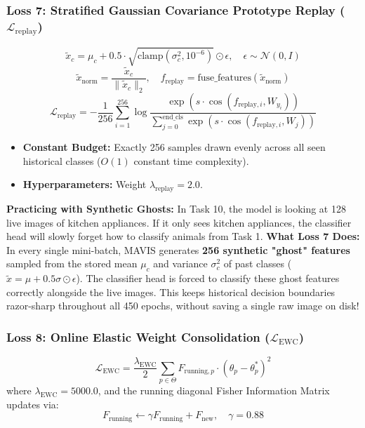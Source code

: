 \documentclass[11pt,a4paper]{article}
\begin{document}
\subsubsection{Loss 7: Stratified Gaussian Covariance Prototype Replay ($\mathcal{L}_{\text{replay}}$)}
\begin{equation}
\tilde{x}_c = \mu_c + 0.5 \cdot \sqrt{\text{clamp}(\sigma_c^2, 10^{-6})} \odot \epsilon, \quad \epsilon \sim \mathcal{N}(0, I)
\end{equation}
\begin{equation}
\tilde{x}_{\text{norm}} = \frac{\tilde{x}_c}{\|\tilde{x}_c\|_2}, \quad f_{\text{replay}} = \text{fuse\_features}(\tilde{x}_{\text{norm}})
\end{equation}
\begin{equation}
\mathcal{L}_{\text{replay}} = - \frac{1}{256} \sum_{i=1}^{256} \log \frac{\exp(s \cdot \cos(f_{\text{replay}, i}, W_{y_i}))}{\sum_{j=0}^{\text{end\_cls}} \exp(s \cdot \cos(f_{\text{replay}, i}, W_j))}
\end{equation}
\begin{itemize}[noitemsep]
    \item \textbf{Constant Budget:} Exactly 256 samples drawn evenly across all seen historical classes ($O(1)$ constant time complexity).
    \item \textbf{Hyperparameters:} Weight $\lambda_{\text{replay}} = 2.0$.
\end{itemize}

\begin{callout}
\textbf{Practicing with Synthetic Ghosts:}\newline
In Task 10, the model is looking at 128 live images of kitchen appliances. If it only sees kitchen appliances, the classifier head will slowly forget how to classify animals from Task 1.\newline
\textbf{What Loss 7 Does:} In every single mini-batch, MAVIS generates \textbf{256 synthetic "ghost" features} sampled from the stored mean $\mu_c$ and variance $\sigma_c^2$ of past classes ($\tilde{x} = \mu + 0.5\sigma \odot \epsilon$). The classifier head is forced to classify these ghost features correctly alongside the live images. This keeps historical decision boundaries razor-sharp throughout all 450 epochs, without saving a single raw image on disk!
\end{callout}

\subsubsection{Loss 8: Online Elastic Weight Consolidation ($\mathcal{L}_{\text{EWC}}$)}
\begin{equation}
\mathcal{L}_{\text{EWC}} = \frac{\lambda_{\text{EWC}}}{2} \sum_{p \in \Theta} F_{\text{running}, p} \cdot \left(\theta_p - \theta_p^*\right)^2
\end{equation}
where $\lambda_{\text{EWC}} = 5000.0$, and the running diagonal Fisher Information Matrix updates via:
\begin{equation}
F_{\text{running}} \leftarrow \gamma F_{\text{running}} + F_{\text{new}}, \quad \gamma = 0.88
\end{equation}
\end{document}
